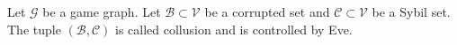 {}
\begin{definition}[Collusion]
  Let $\mathcal{G}$ be a game graph. Let $\mathcal{B} \subset \mathcal{V}$ be a corrupted set and $\mathcal{C} \subset
  \mathcal{V}$ be a Sybil set. The tuple $\left(\mathcal{B}, \mathcal{C}\right)$ is called collusion and is controlled by Eve.
\end{definition}

